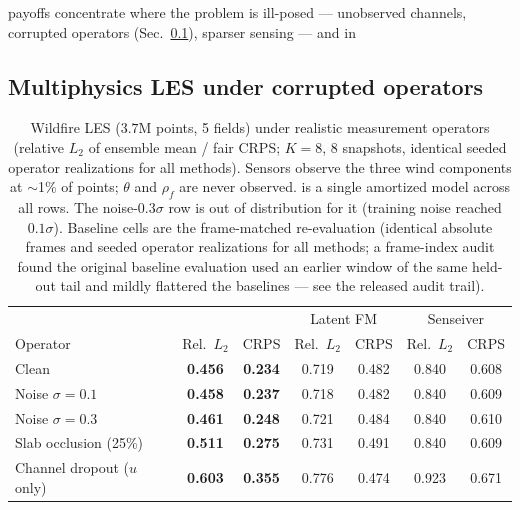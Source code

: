 payoffs concentrate where the problem is ill-posed --- unobserved channels,
corrupted operators (Sec.~\ref{sec:firebench}), sparser sensing --- and in

\subsection{Multiphysics LES under corrupted operators}\label{sec:firebench}

\begin{table}[tbp]
\caption{\label{tab:ops}Wildfire LES ($3.7$M points, 5 fields) under
realistic measurement operators (relative $L_2$ of ensemble mean / fair CRPS;
$K{=}8$, 8 snapshots, identical seeded operator realizations for all
methods). Sensors observe the three wind components at ${\sim}$1\% of points;
$\theta$ and $\rho_f$ are never observed. \dmfgen{} is a single amortized
model across all rows. The noise-$0.3\sigma$ row is out of distribution for
it (training noise reached $0.1\sigma$). Baseline cells are the
frame-matched re-evaluation (identical absolute frames and seeded operator
realizations for all methods; a frame-index audit found the original
baseline evaluation used an earlier window of the same held-out tail and
mildly flattered the baselines --- see the released audit trail).}
\begin{ruledtabular}
\begin{tabular}{lcccccc}
& \multicolumn{2}{c}{\dmfgen{}} & \multicolumn{2}{c}{Latent FM} & \multicolumn{2}{c}{Senseiver} \\
Operator & Rel.\ $L_2$ & CRPS & Rel.\ $L_2$ & CRPS & Rel.\ $L_2$ & CRPS \\
\hline
Clean & \textbf{0.456} & \textbf{0.234} & 0.719 & 0.482 & 0.840 & 0.608 \\
Noise $\sigma{=}0.1$ & \textbf{0.458} & \textbf{0.237} & 0.718 & 0.482 & 0.840 & 0.609 \\
Noise $\sigma{=}0.3$ & \textbf{0.461} & \textbf{0.248} & 0.721 & 0.484 & 0.840 & 0.610 \\
Slab occlusion (25\%) & \textbf{0.511} & \textbf{0.275} & 0.731 & 0.491 & 0.840 & 0.609 \\
Channel dropout ($u$ only) & \textbf{0.603} & \textbf{0.355} & 0.776 & 0.474 & 0.923 & 0.671 \\
\end{tabular}
\end{ruledtabular}
\end{table}

